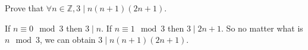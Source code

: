 \documentclass{ctexart}
\newif\ifpreface
\begin{document}
\large
\setlength{\baselineskip}{1.2em}
\date{北京师范大学数学科学学院}
\ifpreface
	
\else
	\maketitle
\fi
{}
\begin{problem}\label{pro:p3.2}
	Prove that \(\forall n \in \mathbb{Z},3 \mid n(n+1)(2n + 1)\).
\end{problem}
\begin{solution}
	If \(n \equiv 0 \mod 3\) then \(3 \mid n\).
	If \(n \equiv 1 \mod 3\) then \(3 \mid 2n+1\).
	So no matter what is \(n \mod 3\), we can obtain \(3 \mid n(n + 1)(2n + 1)\).
\end{solution}
\end{document}
